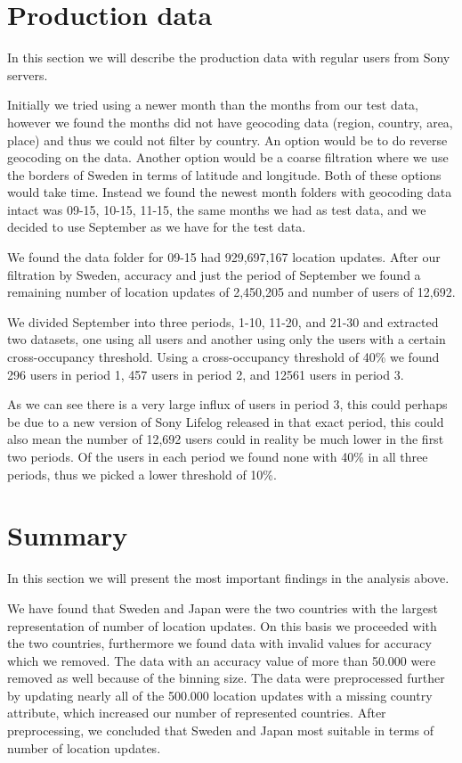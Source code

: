 \section{Production data}
In this section we will describe the production data with regular users from Sony servers.

Initially we tried using a newer month than the months from our test data, however we found the months did not have geocoding data (region, country, area, place) and thus we could not filter by country. An option would be to do reverse geocoding on the data. Another option would be a coarse filtration where we use the borders of Sweden in terms of latitude and longitude. Both of these options would take time. Instead we found the newest month folders with geocoding data intact was 09-15, 10-15, 11-15, the same months we had as test data, and we decided to use September as we have for the test data.

We found the data folder for 09-15 had 929,697,167 location updates. After our filtration by Sweden, accuracy and just the period of September we found a remaining number of location updates of 2,450,205 and number of users of 12,692.

We divided September into three periods, 1-10, 11-20, and 21-30 and extracted two datasets, one using all users and another using only the users with a certain cross-occupancy threshold. Using a cross-occupancy threshold of 40\% we found 296 users in period 1, 457 users in period 2, and 12561 users in period 3.

As we can see there is a very large influx of users in period 3, this could perhaps be due to a new version of Sony Lifelog released in that exact period, this could also mean the number of 12,692 users could in reality be much lower in the first two periods. Of the users in each period we found none with 40\% in all three periods, thus we picked a lower threshold of 10\%.




\section{Summary}
In this section we will present the most important findings in the analysis above. 

We have found that Sweden and Japan were the two countries with the largest representation of number of location updates. On this basis we proceeded with the two countries, furthermore we found data with invalid values for accuracy which we removed. The data with an accuracy value of more than 50.000 were removed as well because of the binning size. 
The data were preprocessed further by updating nearly all of the 500.000 location updates with a missing country attribute, which increased our number of represented countries. After preprocessing, we concluded that Sweden and Japan most suitable in terms of number of location updates.

